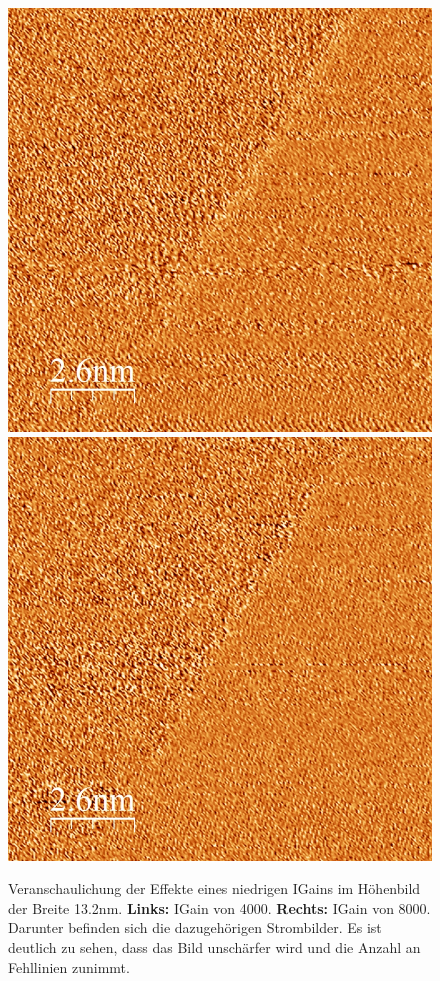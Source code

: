 \documentclass[12pt,a4paper]{article}
\begin{document}
\begin{figure}
\includegraphics[scale=0.36]{Bilder/Igain4000_Strom.jpg}
\includegraphics[scale=0.36]{Bilder/Igain8000_Strom.jpg}
\caption{Veranschaulichung der Effekte eines niedrigen IGains im Höhenbild der Breite 13.2nm. \textbf{Links:} IGain von 4000.  \textbf{Rechts:} IGain von 8000. Darunter befinden sich die dazugehörigen Strombilder. Es ist deutlich zu sehen, dass das Bild unschärfer wird und die Anzahl an Fehllinien zunimmt.}
\label{fig:hoch2_h}
\end{figure}
\end{document}
